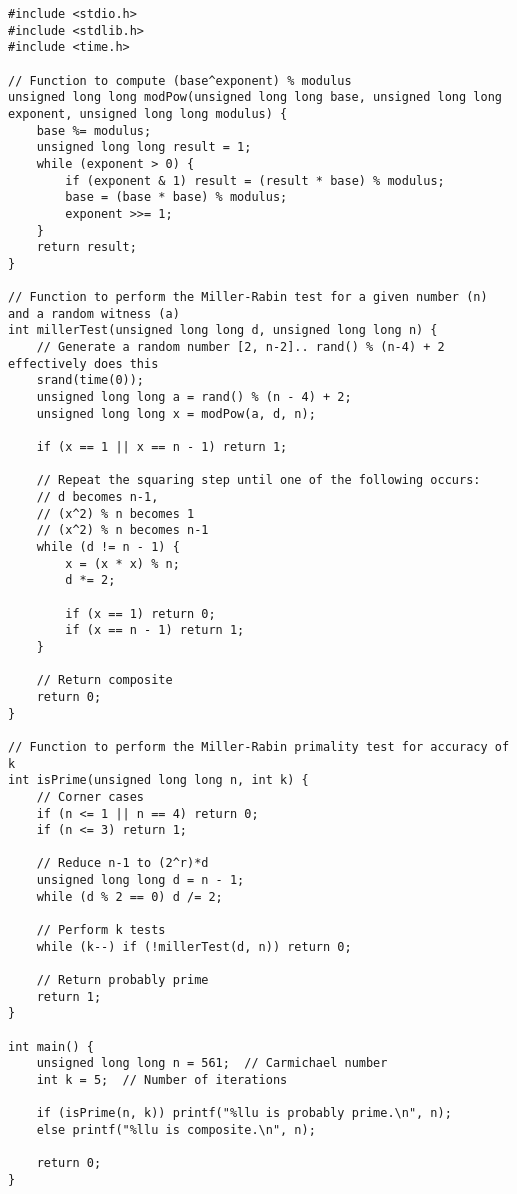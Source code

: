 \documentclass[12pt,openany]{book}
\theoremstyle{definition}
\begin{document}
	\begin{lstlisting}[style=sage, caption={Miller-Rabin Primality Test (C)},captionpos=t]
#include <stdio.h>
#include <stdlib.h>
#include <time.h>

// Function to compute (base^exponent) % modulus
unsigned long long modPow(unsigned long long base, unsigned long long exponent, unsigned long long modulus) {
	base %= modulus;
	unsigned long long result = 1;
	while (exponent > 0) {
		if (exponent & 1) result = (result * base) % modulus;
		base = (base * base) % modulus;
		exponent >>= 1;
	}
	return result;
}

// Function to perform the Miller-Rabin test for a given number (n) and a random witness (a)
int millerTest(unsigned long long d, unsigned long long n) {
	// Generate a random number [2, n-2].. rand() % (n-4) + 2 effectively does this
	srand(time(0));
	unsigned long long a = rand() % (n - 4) + 2;
	unsigned long long x = modPow(a, d, n);
	
	if (x == 1 || x == n - 1) return 1;
	
	// Repeat the squaring step until one of the following occurs:
	// d becomes n-1, 
	// (x^2) % n becomes 1
	// (x^2) % n becomes n-1
	while (d != n - 1) {
		x = (x * x) % n;
		d *= 2;
		
		if (x == 1) return 0;
		if (x == n - 1) return 1;
	}
	
	// Return composite
	return 0;
}

// Function to perform the Miller-Rabin primality test for accuracy of k
int isPrime(unsigned long long n, int k) {
	// Corner cases
	if (n <= 1 || n == 4) return 0;
	if (n <= 3) return 1;
	
	// Reduce n-1 to (2^r)*d
	unsigned long long d = n - 1;
	while (d % 2 == 0) d /= 2;
	
	// Perform k tests
	while (k--) if (!millerTest(d, n)) return 0;
	
	// Return probably prime
	return 1;
}

int main() {
	unsigned long long n = 561;  // Carmichael number
	int k = 5;  // Number of iterations
	
	if (isPrime(n, k)) printf("%llu is probably prime.\n", n);
	else printf("%llu is composite.\n", n);
	
	return 0;
}
	\end{lstlisting}
	\vspace{8pt}
\end{document}
